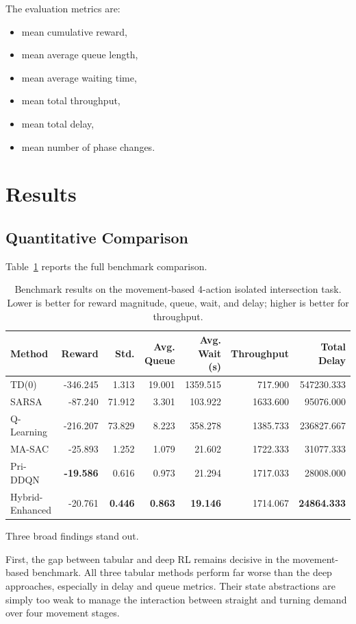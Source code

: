 \documentclass[conference]{IEEEtran}
\begin{document}
The evaluation metrics are:

\begin{itemize}
\item mean cumulative reward,
\item mean average queue length,
\item mean average waiting time,
\item mean total throughput,
\item mean total delay,
\item mean number of phase changes.
\end{itemize}

\section{Results}
\subsection{Quantitative Comparison}
Table~\ref{tab:results} reports the full benchmark comparison.

\begin{table}[t]
\centering
\caption{Benchmark results on the movement-based 4-action isolated
intersection task. Lower is better for reward magnitude, queue, wait,
and delay; higher is better for throughput.}
\label{tab:results}
\begin{tabular}{lrrrrrr}
\toprule
Method & Reward & Std. & Avg. Queue & Avg. Wait (s) & Throughput & Total Delay \\
\midrule
TD(0) & -346.245 & 1.313 & 19.001 & 1359.515 & 717.900 & 547230.333 \\
SARSA & -87.240 & 71.912 & 3.301 & 103.922 & 1633.600 & 95076.000 \\
Q-Learning & -216.207 & 73.829 & 8.223 & 358.278 & 1385.733 & 236827.667 \\
MA-SAC & -25.893 & 1.252 & 1.079 & 21.602 & 1722.333 & 31077.333 \\
Pri-DDQN & \textbf{-19.586} & 0.616 & 0.973 & 21.294 & 1717.033 & 28008.000 \\
Hybrid-Enhanced & -20.761 & \textbf{0.446} & \textbf{0.863} & \textbf{19.146} & 1714.067 & \textbf{24864.333} \\
\bottomrule
\end{tabular}
\end{table}

Three broad findings stand out.

First, the gap between tabular and deep RL remains decisive in the
movement-based benchmark. All three tabular methods perform far worse
than the deep approaches, especially in delay and queue metrics.
Their state abstractions are simply too weak to manage the interaction
between straight and turning demand over four movement stages.
\end{document}
